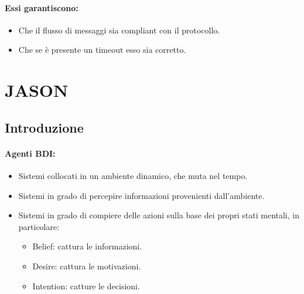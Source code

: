 \paragraph{Essi garantiscono:}

\begin{itemize}
  \item Che il flusso di messaggi sia compliant con il protocollo. 
  \item Che se è presente un timeout esso sia corretto.
\end{itemize}

\section{JASON}

\subsection{Introduzione}




\paragraph{Agenti BDI:}

\begin{itemize}
  \item Sistemi collocati in un ambiente dinamico, che muta nel tempo. 
  \item Sistemi in grado di percepire informazioni provenienti dall'ambiente. 
  \item Sistemi in grado di compiere delle azioni sulla base dei propri stati mentali, in particolare:
    \begin{itemize}
      \item Belief: cattura le informazioni. 
      \item Desire: cattura le motivazioni. 
      \item Intention: catture le decisioni.
    \end{itemize}
\end{itemize}

